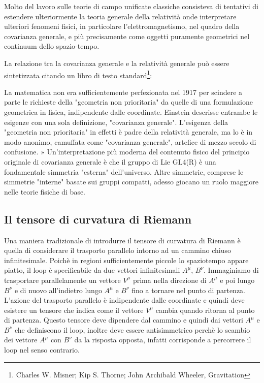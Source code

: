 \documentclass[twoside]{article}
\begin{document}
Molto del lavoro sulle teorie di campo unificate classiche consisteva di tentativi di estendere ulteriormente la teoria generale della relatività onde interpretare ulteriori fenomeni fisici, in particolare l'elettromagnetismo, nel quadro della covarianza generale, e più precisamente come oggetti puramente geometrici nel continuum dello spazio-tempo.

La relazione tra la covarianza generale e la relatività generale può essere sintetizzata citando un libro di testo standard\footnote{ Charles W. Misner; Kip S. Thorne; John Archibald Wheeler, Gravitation }:
\begin{textit}
La matematica non era sufficientemente perfezionata nel 1917 per scindere a parte le richieste della "geometria non prioritaria" da quelle di una formulazione geometrica in fisica, indipendente dalle coordinate. Einstein descrisse entrambe le esigenze con una sola definizione, "covarianza generale". L'esigenza della "geometria non prioritaria" in effetti è padre della relatività generale, ma lo è in modo anonimo, camuffata come "covarianza generale", artefice di mezzo secolo di confusione. »
Un'interpretazione più moderna del contenuto fisico del principio originale di covarianza generale è che il gruppo di Lie GL4(R) è una fondamentale simmetria "esterna" dell'universo. Altre simmetrie, comprese le simmetrie "interne" basate sui gruppi compatti, adesso giocano un ruolo maggiore nelle teorie fisiche di base.
\end{textit}

\subsection{Il tensore di curvatura di Riemann}
Una maniera tradizionale di introdurre il tensore di curvatura di Riemann è quella di considerare il trasporto parallelo intorno ad un cammino chiuso infinitesimale.
Poichè in regioni sufficientemente piccole lo spaziotempo appare piatto, il loop  è specificabile da due vettori infinitesimali $A^\mu$, $B^\nu$. Immaginiamo di trasportare parallelamente un vettore $V^\mu$ prima nella direzione di $A^\mu$ e poi lungo $B^\nu$ e di nuovo all'indietro lungo $A^\mu$ e $B^\nu$ fino a tornare nel punto di partenza. L'azione del trasporto parallelo è indipendente dalle coordinate e quindi deve esistere un tensore che indica come il vettore $V^\mu$ cambia quando ritorna al punto di partenza. Questo tensore deve dipendere dal cammino  e quindi dai vettori $A^\mu$ e $B^\nu$ che definiscono il loop, inoltre deve essere antisimmetrico perchè lo scambio dei vettore $A^\mu$ con $B^\nu$ da la risposta opposta, infatti corrisponde a percorrere il loop nel senso contrario.
\end{document}
